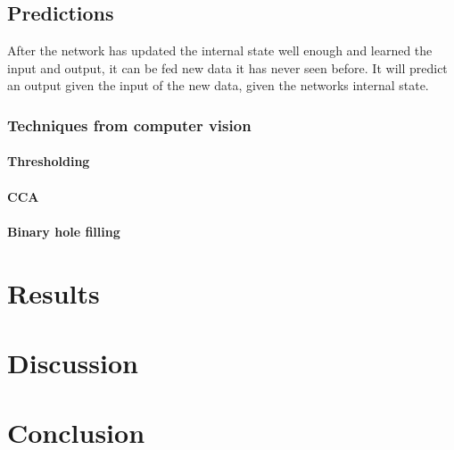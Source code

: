 \documentclass[USenglish]{ifimaster}  %
\begin{document}
\section{Predictions}
After the network has updated the internal state well enough and learned the input and output, it can be fed new data it has never seen before. It will predict an output given the input of the new data, given the networks internal state.  
\subsection{Techniques from computer vision}
\subsubsection{Thresholding}
\subsubsection{CCA}
\subsubsection{Binary hole filling}

\chapter{Results}                     

\chapter{Discussion}

\chapter{Conclusion}



\backmatter{}
\printbibliography
\end{document}
